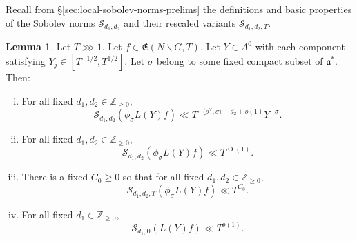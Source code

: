\documentclass[reqno]{amsart}
\def\O{\operatorname{O}}
\theoremstyle{plain} \newtheorem{theorem} {Theorem}
\theoremstyle{definition} \newtheorem{definition} [theorem] {Definition}
\theoremstyle{itplain} %
\newtheorem{lemma}[theorem]{Lemma}
\numberwithin{equation}{section}
\numberwithin{theorem}{section}
\renewcommand{\geq}{\geqslant}
\begin{document}
Recall from  \S\ref{sec:local-sobolev-norms-prelims} the definitions and basic properties of the Sobolev norms $\mathcal{S}_{d_1,d_2}$ and their rescaled variants $\mathcal{S}_{d_1,d_2,T}$.

\begin{lemma}\label{lem:lemma-Sobolev-estimates-frakE}
  Let $T \ggg 1$.  Let $f \in \mathfrak{E}(N \backslash G, T)$.  Let $Y \in A^0$ with each component satisfying $Y_j \in [T^{-1/2}, T^{1/2}]$.  Let $\sigma$ belong to some fixed compact subset of $\mathfrak{a}^*$.  Then:
  \begin{enumerate}[(i)]
  \item  \label{item:sobolev-frakE-0} For all fixed $d_1,d_2 \in \mathbb{Z}_{\geq 0}$,
    \begin{equation}\label{eq:mathc-d_2-phi_s}
      \mathcal{S}_{d_1,d_2} \left(\phi_{\sigma} L(Y) f\right) \ll T^{- \langle \rho^\vee , \sigma  \rangle + d_2 + o(1)} Y^{-\sigma}.
    \end{equation}
  \item \label{item:sobolev-frakE-1} For all fixed $d_1, d_2 \in \mathbb{Z}_{\geq 0}$,
    \begin{equation}\label{eq:mathc-d_2-det_m}
      \mathcal{S}_{d_1,d_2} (\phi_\sigma  L(Y) f) \ll T^{\O(1)}.
    \end{equation}
  \item \label{item:sobolev-frakE-2} There is a fixed $C_0 \geq 0$ so that for all fixed $d_1, d_2 \in \mathbb{Z}_{\geq 0}$,
    \begin{equation*}
      \mathcal{S}_{d_1,d_2,T} (\phi_{\sigma} L(Y) f) \ll T^{C_0}.
    \end{equation*}
  \item  \label{item:sobolev-frakE-3} For all fixed $d_1 \in \mathbb{Z}_{\geq 0}$,
    \begin{equation*}
      \mathcal{S}_{d_1,0}(L(Y) f) \ll T^{o(1)}.
    \end{equation*}
  \end{enumerate}
\end{lemma}
\end{document}
